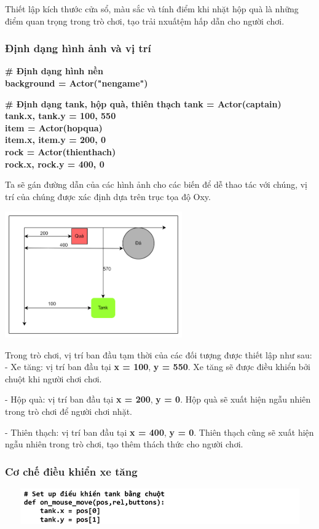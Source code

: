 \documentclass[a4paper]{article}
\begin{document}
Thiết lập kích thước cửa sổ, màu sắc và tính điểm khi nhặt hộp quà là
những điểm quan trọng trong trò chơi, tạo trải nxuấtệm hấp dẫn cho người
chơi.
\subsubsection{Định dạng hình ảnh và vị trí}
\textbf{\# Định dạng hình nền}\\
\textbf{background = Actor("nengame")}

\textbf{\# Định dạng tank, hộp quà, thiên thạch tank =
Actor(\textquotesingle captain\textquotesingle)}\\
\textbf{tank.x, tank.y = 100, 550}\\
\textbf{item = Actor(\textquotesingle hopqua\textquotesingle)}\\
\textbf{item.x, item.y = 200, 0}\\
\textbf{rock = Actor(\textquotesingle thienthach\textquotesingle)}\\
\textbf{rock.x, rock.y = 400, 0}

Ta sẽ gán đường dẫn của các hình ảnh cho các biến để dễ thao tác với
chúng, vị trí của chúng được xác định dựa trên trục tọa độ Oxy.

\includegraphics[width=2.99583in,height=2.14306in]{image12.png}

Trong trò chơi, vị trí ban đầu tạm thời của các đối tượng được thiết lập
như sau: \\
- Xe tăng: vị trí ban đầu tại \textbf{x = 100}, \textbf{y = 550}. Xe tăng sẽ được điều khiển bởi chuột khi người chơi chơi.

- Hộp quà: vị trí ban đầu tại \textbf{x = 200}, \textbf{y = 0}. Hộp quà sẽ xuất hiện ngẫu nhiên trong trò chơi để người chơi nhặt.

- Thiên thạch: vị trí ban đầu tại \textbf{x = 400}, \textbf{y = 0}. Thiên thạch cũng sẽ xuất hiện ngẫu nhiên trong trò chơi, tạo thêm thách thức cho người chơi.
\subsubsection{Cơ chế điều khiển xe tăng}
\includegraphics[width=5.5in,height=0.6in]{image12_2.png}
\end{document}
